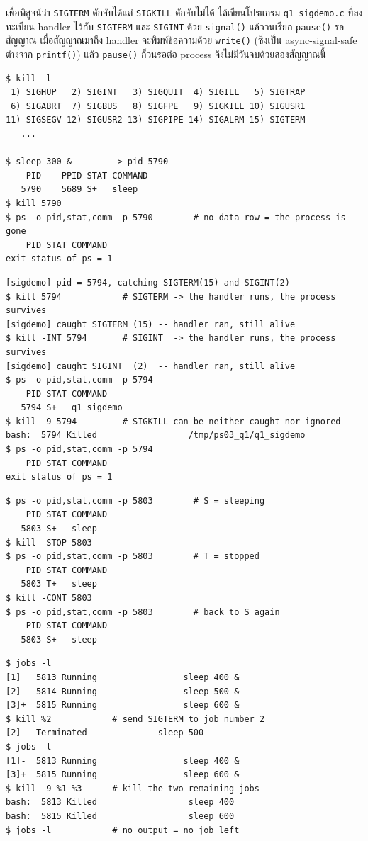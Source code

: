 \documentclass[a4paper,11pt]{article}
\newcommand{\code}[1]{\texttt{#1}}
\begin{document}
เพื่อพิสูจน์ว่า \code{SIGTERM} ดักจับได้แต่ \code{SIGKILL} ดักจับไม่ได้
ได้เขียนโปรแกรม \code{q1\_sigdemo.c} ที่ลงทะเบียน handler ไว้กับ \code{SIGTERM}
และ \code{SIGINT} ด้วย \code{signal()} แล้ววนเรียก \code{pause()} รอสัญญาณ
เมื่อสัญญาณมาถึง handler จะพิมพ์ข้อความด้วย \code{write()} (ซึ่งเป็น
async-signal-safe ต่างจาก \code{printf()}) แล้ว \code{pause()} ก็วนรอต่อ
process จึงไม่มีวันจบด้วยสองสัญญาณนี้

\begin{lstlisting}[style=terminal,caption={\code{kill -l} (ตัดมา 4 แถวแรก) และ \code{kill} ด้วยสัญญาณตั้งต้น}]
$ kill -l
 1) SIGHUP	 2) SIGINT	 3) SIGQUIT	 4) SIGILL	 5) SIGTRAP
 6) SIGABRT	 7) SIGBUS	 8) SIGFPE	 9) SIGKILL	10) SIGUSR1
11) SIGSEGV	12) SIGUSR2	13) SIGPIPE	14) SIGALRM	15) SIGTERM
   ...

$ sleep 300 &        -> pid 5790
    PID    PPID STAT COMMAND
   5790    5689 S+   sleep
$ kill 5790
$ ps -o pid,stat,comm -p 5790        # no data row = the process is gone
    PID STAT COMMAND
exit status of ps = 1
\end{lstlisting}

\begin{lstlisting}[style=terminal,caption={process ที่ดักจับ SIGTERM ไว้ ต้องใช้ \code{kill -9} เท่านั้น}]
[sigdemo] pid = 5794, catching SIGTERM(15) and SIGINT(2)
$ kill 5794            # SIGTERM -> the handler runs, the process survives
[sigdemo] caught SIGTERM (15) -- handler ran, still alive
$ kill -INT 5794       # SIGINT  -> the handler runs, the process survives
[sigdemo] caught SIGINT  (2)  -- handler ran, still alive
$ ps -o pid,stat,comm -p 5794
    PID STAT COMMAND
   5794 S+   q1_sigdemo
$ kill -9 5794         # SIGKILL can be neither caught nor ignored
bash:  5794 Killed                  /tmp/ps03_q1/q1_sigdemo
$ ps -o pid,stat,comm -p 5794
    PID STAT COMMAND
exit status of ps = 1
\end{lstlisting}

\begin{lstlisting}[style=terminal,caption={\code{kill -STOP} / \code{-CONT} พักและปลุกแทนการฆ่า}]
$ ps -o pid,stat,comm -p 5803        # S = sleeping
    PID STAT COMMAND
   5803 S+   sleep
$ kill -STOP 5803
$ ps -o pid,stat,comm -p 5803        # T = stopped
    PID STAT COMMAND
   5803 T+   sleep
$ kill -CONT 5803
$ ps -o pid,stat,comm -p 5803        # back to S again
    PID STAT COMMAND
   5803 S+   sleep
\end{lstlisting}

\begin{lstlisting}[style=terminal,caption={การฆ่า job ด้วย job spec \code{\%n}}]
$ jobs -l
[1]   5813 Running                 sleep 400 &
[2]-  5814 Running                 sleep 500 &
[3]+  5815 Running                 sleep 600 &
$ kill %2            # send SIGTERM to job number 2
[2]-  Terminated              sleep 500
$ jobs -l
[1]-  5813 Running                 sleep 400 &
[3]+  5815 Running                 sleep 600 &
$ kill -9 %1 %3      # kill the two remaining jobs
bash:  5813 Killed                  sleep 400
bash:  5815 Killed                  sleep 600
$ jobs -l            # no output = no job left
\end{lstlisting}
\end{document}
